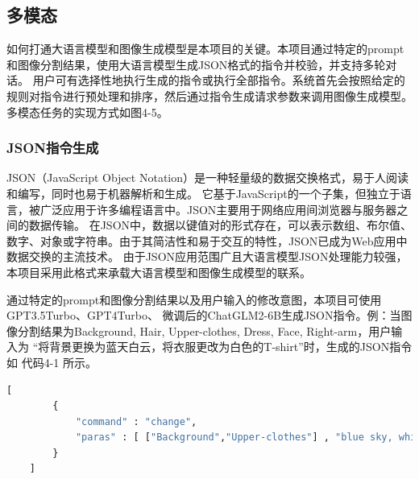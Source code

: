 \documentclass[a4paper,AutoFakeBold,oneside,12pt]{book}
\begin{document}
\subsection{多模态}
如何打通大语言模型和图像生成模型是本项目的关键。本项目通过特定的prompt和图像分割结果，使用大语言模型生成JSON格式的指令并校验，并支持多轮对话。
用户可有选择性地执行生成的指令或执行全部指令。系统首先会按照给定的规则对指令进行预处理和排序，然后通过指令生成请求参数来调用图像生成模型。多模态任务的实现方式如图4-5。

\subsubsection{JSON指令生成}
JSON（JavaScript Object Notation）是一种轻量级的数据交换格式，易于人阅读和编写，同时也易于机器解析和生成。
它基于JavaScript的一个子集，但独立于语言，被广泛应用于许多编程语言中。JSON主要用于网络应用间浏览器与服务器之间的数据传输。
在JSON中，数据以键值对的形式存在，可以表示数组、布尔值、数字、对象或字符串。由于其简洁性和易于交互的特性，JSON已成为Web应用中数据交换的主流技术。
由于JSON应用范围广且大语言模型JSON处理能力较强，本项目采用此格式来承载大语言模型和图像生成模型的联系。

通过特定的prompt和图像分割结果以及用户输入的修改意图，本项目可使用GPT3.5Turbo、GPT4Turbo、
微调后的ChatGLM2-6B生成JSON指令。例：当图像分割结果为Background, Hair, Upper-clothes, Dress, Face, Right-arm，用户输入为
“将背景更换为蓝天白云，将衣服更改为白色的T-shirt”时，生成的JSON指令如 代码4-1 所示。

\begin{lstlisting}[language=Python, caption=生成的指令, label=plus, tabsize=2]  
    [
        {
            "command" : "change",
            "paras" : [ ["Background","Upper-clothes"] , "blue sky, white T-shirt"]
        }
    ]
\end{lstlisting} 
\end{document}

